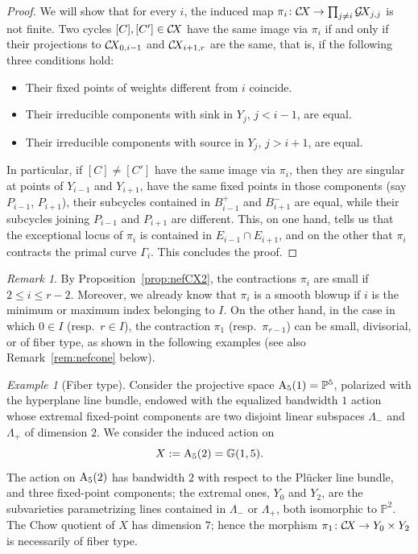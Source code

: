 \documentclass[10pt,a4paper]{article}
\numberwithin{equation}{section}
\theoremstyle{definition}
\theoremstyle{remark}
\newtheorem{remark}[theorem]{Remark}
\newtheorem{example}[theorem]{Example}
\newcommand\PP{{\mathbb{P}}}
\def\G{{\mathbb G}}
\def\P{{\mathbb P}}
\def\G{{\mathbb{G}}}
\def\DA{{\rm A}}
\def\GX{\mathcal{G}\!X\hspace{-0.5pt}}
\def\CX{\mathcal{C}\!X\hspace{-0.5pt}}
\begin{document}
\begin{proof}
We will show that for every $i$, the induced map $\pi_i\colon \CX \to \prod_{j\not =  i} \GX_{j,j}$ is not finite. Two cycles $[C],[C'] \in \CX$ have the same image via $\pi_i$ if and only if their projections to $\CX_{0,i-1}$ and $\CX_{i+1,r}$ are the same, that is, if the following three conditions hold:
\begin{itemize}
\item Their fixed points of weights different from $i$ coincide. 
\item Their irreducible components  with sink in $Y_j$, $j < i-1$, are equal.
\item Their irreducible components with source in $Y_j$, $j > i+1$, are equal.
\end{itemize}

In particular, if $[C]\neq [C']$ have the same image via $\pi_i$, then they are singular at points of  $Y_{i-1}$ and $Y_{i+1}$, have the same fixed points in those components (say $P_{i-1}$, $P_{i+1}$), their subcycles contained in $B_{i-1}^+$ and $B_{i+1}^-$ are equal, while their subcycles joining $P_{i-1}$ and $P_{i+1}$ are different. This, on one hand, tells us that the exceptional locus of $\pi_i$ is contained in $E_{i-1}\cap E_{i+1}$, and on the other that $\pi_i$ contracts the primal curve $\Gamma_i$. This concludes the proof.
\end{proof}

\begin{remark}
By Proposition~\ref{prop:nefCX2}, the contractions $\pi_i$ are small if $2 \le i \le r-2$. 
Moreover, we already know that $\pi_i$ is a smooth blowup if $i$ is the minimum or maximum index belonging to $I$.
On the other hand, in the case in which $0\in I$ (resp.\ $r \in I$), the contraction $\pi_1$ (resp.\ $\pi_{r-1}$) can be small, divisorial, or of fiber type, as shown in the following examples (see also Remark~\ref{rem:nefcone} below).
\end{remark}

\begin{example}[Fiber type]\label{ex:ft} 
Consider the projective space $\DA_{5}(1)= \PP^{5}$, polarized with the hyperplane line bundle, endowed with the equalized bandwidth $1$ action whose extremal fixed-point components are two disjoint linear subspaces $\Lambda_-$ and $\Lambda_+$ of dimension $2$. We consider the induced action on \[X:=\DA_5(2) = \G(1,5).\]
The action on $\DA_{5}(2)$ has bandwidth $2$ with respect to the Pl{\"u}cker line bundle, and three fixed-point components; the extremal ones, $Y_0$ and $Y_2$, are the subvarieties parametrizing lines contained in $\Lambda_-$ or $\Lambda_+$, both isomorphic to $\P^2$. 
The Chow quotient of $X$ has dimension $7$; hence the morphism $\pi_1\colon \CX\to Y_0\times Y_2$ is necessarily of fiber type.
\end{example}
\end{document}

